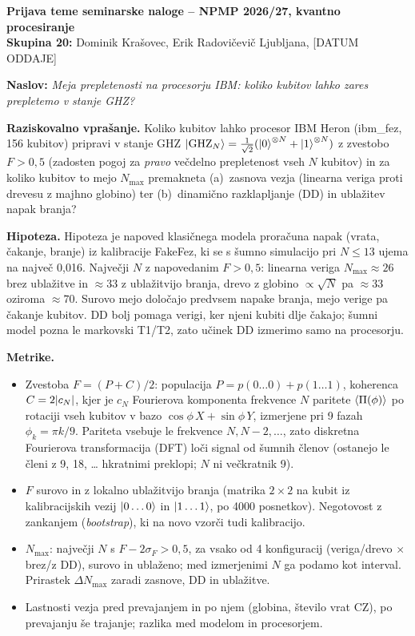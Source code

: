 \documentclass[10pt,a4paper]{article}
\begin{document}
{\large\textbf{Prijava teme seminarske naloge -- NPMP 2026/27, kvantno procesiranje}}\\
\textbf{Skupina 20:} Dominik Krašovec, Erik Radovičevič \hfill Ljubljana, [DATUM ODDAJE]

\medskip
\textbf{Naslov:} \emph{Meja prepletenosti na procesorju IBM: koliko kubitov lahko zares prepletemo v stanje GHZ?}

\textbf{Raziskovalno vprašanje.} Koliko kubitov lahko procesor IBM Heron (ibm\_fez, 156 kubitov) pripravi v stanje GHZ
$\ket{\mathrm{GHZ}_N}=\tfrac{1}{\sqrt2}(\ket{0}^{\otimes N}+\ket{1}^{\otimes N})$ z zvestobo $F>0{,}5$
(zadosten pogoj za \emph{pravo} večdelno prepletenost vseh $N$ kubitov) in za koliko kubitov to mejo $N_{\max}$
premakneta (a)~zasnova vezja (linearna veriga proti drevesu z majhno globino) ter (b)~dinamično razklapljanje (DD) in ublažitev napak branja?

\textbf{Hipoteza.} Hipoteza je napoved klasičnega modela proračuna napak (vrata, čakanje, branje) iz kalibracije FakeFez, ki se s
šumno simulacijo pri $N\le13$ ujema na največ 0,016. Največji $N$ z napovedanim $F>0{,}5$: linearna veriga $N_{\max}\approx 26$
brez ublažitve in $\approx 33$ z ublažitvijo branja, drevo z globino $\propto\!\sqrt N$ pa $\approx 33$ oziroma $\approx 70$. Surovo mejo določajo predvsem napake branja, mejo verige pa
čakanje kubitov. DD bolj pomaga verigi, ker njeni kubiti dlje čakajo; šumni model pozna le markovski T1/T2, zato učinek DD
izmerimo samo na procesorju.

\textbf{Metrike.}
\begin{itemize}
\item Zvestoba $F=(P+C)/2$: populacija $P=p(0\dots0)+p(1\dots1)$, koherenca $C=2\abs{c_N}$, kjer je $c_N$ Fourierova komponenta
      frekvence $N$ paritete $\expval{\Pi(\phi)}$ po rotaciji vseh kubitov v bazo $\cos\phi\,X+\sin\phi\,Y$, izmerjene pri 9 fazah
      $\phi_k=\pi k/9$. Pariteta vsebuje le frekvence $N, N-2,\dots$, zato diskretna Fourierova transformacija (DFT) loči signal od
      šumnih členov (ostanejo le členi z 9, 18, \dots{} hkratnimi preklopi; $N$ ni večkratnik 9).
\item $F$ surovo in z lokalno ublažitvijo branja (matrika $2\times2$ na kubit iz kalibracijskih vezij $\ket{0\dots0}$ in
      $\ket{1\dots1}$, po 4000 posnetkov). Negotovost z zankanjem (\emph{bootstrap}), ki na novo vzorči tudi kalibracijo.
\item $N_{\max}$: največji $N$ s $F-2\sigma_F>0{,}5$, za vsako od 4 konfiguracij (veriga/drevo $\times$ brez/z DD), surovo in
      ublaženo; med izmerjenimi $N$ ga podamo kot interval. Prirastek $\Delta N_{\max}$ zaradi zasnove, DD in ublažitve.
\item Lastnosti vezja pred prevajanjem in po njem (globina, število vrat CZ), po prevajanju še trajanje; razlika med modelom in procesorjem.
\end{itemize}
\end{document}
